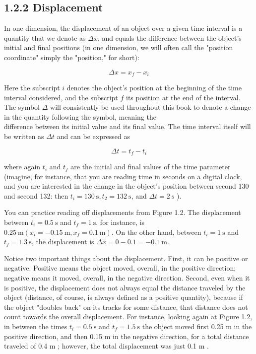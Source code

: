 \documentclass[10pt]{article}
\begin{document}
\subsection*{1.2.2 Displacement}
In one dimension, the displacement of an object over a given time interval is a quantity that we denote as $\Delta x$, and equals the difference between the object's initial and final positions (in one dimension, we will often call the "position coordinate" simply the "position," for short):


\begin{equation*}
\Delta x=x_{f}-x_{i} \tag{1.1}
\end{equation*}


Here the subscript $i$ denotes the object's position at the beginning of the time interval considered, and the subscript $f$ its position at the end of the interval. The symbol $\Delta$ will consistently be used throughout this book to denote a change in the quantity following the symbol, meaning the\\
difference between its initial value and its final value. The time interval itself will be written as $\Delta t$ and can be expressed as


\begin{equation*}
\Delta t=t_{f}-t_{i} \tag{1.2}
\end{equation*}


where again $t_{i}$ and $t_{f}$ are the initial and final values of the time parameter (imagine, for instance, that you are reading time in seconds on a digital clock, and you are interested in the change in the object's position between second 130 and second 132: then $t_{i}=130 \mathrm{~s}, t_{2}=132 \mathrm{~s}$, and $\Delta t=2 \mathrm{~s}$ ).

You can practice reading off displacements from Figure 1.2. The displacement between $t_{i}=0.5 \mathrm{~s}$ and $t_{f}=1 \mathrm{~s}$, for instance, is $0.25 \mathrm{~m}\left(x_{i}=-0.15 \mathrm{~m}, x_{f}=0.1 \mathrm{~m}\right)$. On the other hand, between $t_{i}=1 \mathrm{~s}$ and $t_{f}=1.3 \mathrm{~s}$, the displacement is $\Delta x=0-0.1=-0.1 \mathrm{~m}$.

Notice two important things about the displacement. First, it can be positive or negative. Positive means the object moved, overall, in the positive direction; negative means it moved, overall, in the negative direction. Second, even when it is positive, the displacement does not always equal the distance traveled by the object (distance, of course, is always defined as a positive quantity), because if the object "doubles back" on its tracks for some distance, that distance does not count towards the overall displacement. For instance, looking again at Figure 1.2, in between the times $t_{i}=0.5 \mathrm{~s}$ and $t_{f}=1.5 \mathrm{~s}$ the object moved first 0.25 m in the positive direction, and then 0.15 m in the negative direction, for a total distance traveled of 0.4 m ; however, the total displacement was just 0.1 m .
\end{document}
